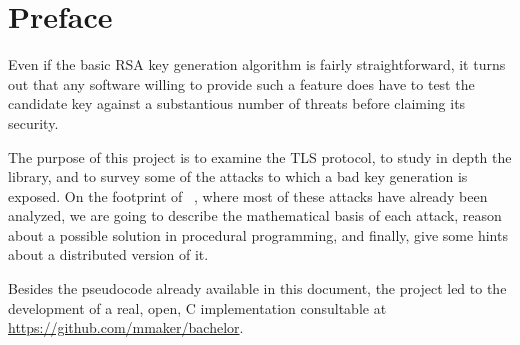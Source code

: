 \chapter{Preface}

Even if the basic RSA key generation algorithm is fairly straightforward, it
turns out that any software willing to provide such a feature does have to test
the candidate key against a substantious number of threats before claiming its
security.

The purpose of this project is to examine the TLS protocol, to study in depth
the \openssl library, and to survey some of the attacks to which a bad key
generation is exposed. On the footprint of ~\cite{20years}, where most of these
attacks have already been analyzed, we are going to describe the mathematical
basis of each attack, reason about a possible solution in procedural
programming, and finally, give some hints about a distributed version of it.

Besides the pseudocode already available in this document, the project led to the
development of a real, open, C implementation consultable at
\small{\url{https://github.com/mmaker/bachelor}}.

